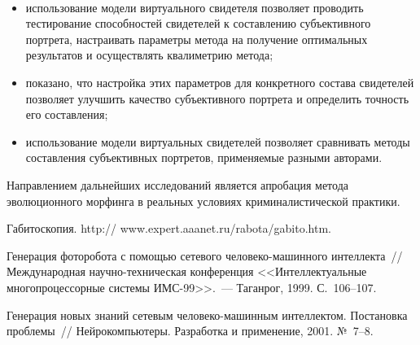 \begin{figure} %
\vspace*{1pt}
\begin{center}
\mbox{%
\epsfxsize=164.062mm
}
\end{center}
\vspace*{-9pt}
\vspace*{6pt}
\end{figure}
     

\begin{multicols}{2}

\noindent
\begin{itemize}
\item использование модели виртуального свидетеля позволяет проводить 
тестирование способностей свидетелей к составлению субъективного 
портрета, настраивать параметры метода на получение оптимальных 
результатов и осуществлять квалиметрию метода;
\item показано, что настройка этих параметров для конкретного состава 
свидетелей позволяет улучшить качество субъективного портрета и 
определить точность его составления;
\item использование модели виртуальных свидетелей позволяет 
сравнивать методы составления субъективных портретов, применяемые 
разными авторами.
\end{itemize}

     Направлением дальнейших исследований является апробация метода 
эволюционного морфинга в реальных условиях криминалистической практики. 
     
{\small\frenchspacing
{%
\begin{thebibliography}{99}

Габитоскопия. {\sf http:// www.expert.aaanet.ru/rabota/gabito.htm}.

Генерация фоторобота с помощью сетевого че\-ло\-ве\-ко-ма\-шин\-но\-го интеллекта~// 
Международная на\-уч\-но-тех\-ни\-че\-ская конференция <<Интеллектуальные многопроцессорные 
системы ИМС-99>>.~--- Таганрог, 1999. С.~106--107.

Генерация новых знаний сетевым че\-ло\-ве\-ко-машинным интеллектом. Постановка 
проб\-ле\-мы~// Нейрокомпьютеры. Разработка и применение, 2001. № \,7--8.


\end{thebibliography}}}
\end{multicols}
